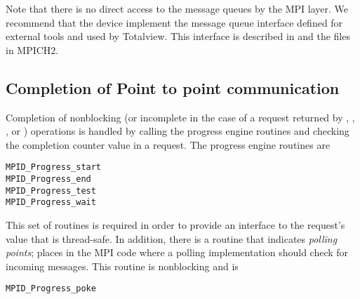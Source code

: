 {Note that there is no direct access to the message queues by the MPI
layer.  We recommend that the device implement the message queue
interface defined for external tools and used by Totalview.  This
interface is described in \cite{pvmmpi99-totalview} and the files
 in MPICH2.

\subsection{Completion of Point to point communication}
Completion of nonblocking (or incomplete in the case of a request
returned by , , , or
) operations is handled by calling the progress engine routines
and checking the completion counter value in a request.  The progress engine
routines are
\begin{verbatim}
MPID_Progress_start
MPID_Progress_end
MPID_Progress_test
MPID_Progress_wait
\end{verbatim}
This set of routines is required in order to provide an
interface to the request's  value that is thread-safe.
In addition, there is a routine that indicates \emph{polling
  points}; 
places in the MPI code where a polling implementation should check for
incoming messages.  This routine is nonblocking and is 
\begin{verbatim}
MPID_Progress_poke
\end{verbatim}



}
